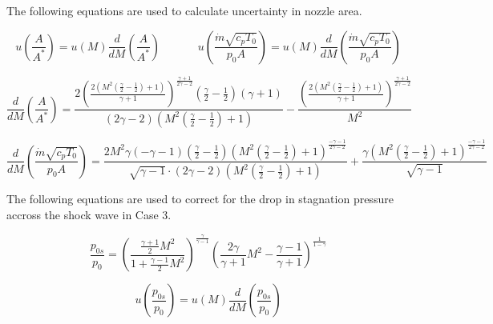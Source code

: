 \documentclass{article}
\begin{document}
The following equations are used to calculate uncertainty in nozzle area.

\begin{equation}
    u\left( \frac{A}{A^*} \right) = u(M) \frac{d}{dM}\left( \frac{A}{A^*} \right) \;\;\;\;\;\;\;\;\;\;\;\; u\left( \frac{\dot{m}\sqrt{c_pT_0}}{p_0A} \right) = u(M) \frac{d}{dM}\left( \frac{\dot{m}\sqrt{c_pT_0}}{p_0A} \right)
\end{equation}

\begin{equation}
    \frac{d}{dM}\left( \frac{A}{A^*} \right) = \frac{2 \left(\frac{2 \left(M^{2} \left(\frac{\gamma}{2} - \frac{1}{2}\right) + 1\right)}{\gamma + 1}\right)^{\frac{\gamma + 1}{2 \gamma - 2}} \left(\frac{\gamma}{2} - \frac{1}{2}\right) \left(\gamma + 1\right)}{\left(2 \gamma - 2\right) \left(M^{2} \left(\frac{\gamma}{2} - \frac{1}{2}\right) + 1\right)} - \frac{\left(\frac{2 \left(M^{2} \left(\frac{\gamma}{2} - \frac{1}{2}\right) + 1\right)}{\gamma + 1}\right)^{\frac{\gamma + 1}{2 \gamma - 2}}}{M^{2}}
    \label{eqn:dA_dM}
\end{equation}

\begin{equation}
    \frac{d}{dM}\left( \frac{\dot{m}\sqrt{c_pT_0}}{p_0A} \right) = \frac{2 M^{2} \gamma \left(- \gamma - 1\right) \left(\frac{\gamma}{2} - \frac{1}{2}\right) \left(M^{2} \left(\frac{\gamma}{2} - \frac{1}{2}\right) + 1\right)^{\frac{- \gamma - 1}{2 \gamma - 2}}}{\sqrt{\gamma - 1} \cdot \left(2 \gamma - 2\right) \left(M^{2} \left(\frac{\gamma}{2} - \frac{1}{2}\right) + 1\right)} + \frac{\gamma \left(M^{2} \left(\frac{\gamma}{2} - \frac{1}{2}\right) + 1\right)^{\frac{- \gamma - 1}{2 \gamma - 2}}}{\sqrt{\gamma - 1}}
    \label{eqn:dmdot_dM}
\end{equation}

The following equations are used to correct for the drop in stagnation pressure accross the shock wave in Case 3.

\begin{equation}
    \frac{p_{0s}}{p_0} = \left( \frac{\frac{\gamma+1}{2}M^2}{1 + \frac{\gamma-1}{2}M^2}\right) ^ \frac{\gamma}{\gamma-1} \left( \frac{2\gamma}{\gamma+1} M^2 - \frac{\gamma-1}{\gamma+1}\right) ^ \frac{1}{1 - \gamma}
\end{equation}

\begin{equation}
    u\left( \frac{p_{0s}}{p_0} \right) = u(M) \frac{d}{dM}\left( \frac{p_{0s}}{p_0} \right)
\end{equation}
\end{document}
